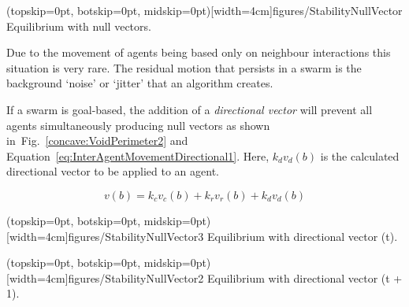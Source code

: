 \documentclass{ieeeaccess}
\begin{document}
\Figure[t!](topskip=0pt, botskip=0pt, midskip=0pt)[width=4cm]{figures/StabilityNullVector}
{Equilibrium with null vectors.\label{methods:StabilityNullVector}}


Due to the movement of agents being based only on neighbour interactions this situation is very rare. The residual motion that persists in a swarm is the background `noise' or `jitter' that an algorithm creates.

If a swarm is goal-based, the addition of a \textit{directional vector} will prevent all agents simultaneously producing null vectors as shown in~Fig.~\ref{concave:VoidPerimeter2} and Equation~\ref{eq:InterAgentMovementDirectional1}. Here, $k_dv_{d}(b)$ is the calculated directional vector to be applied to an agent.

\begin{equation}\label{eq:InterAgentMovementDirectional1}
v(b) = k_cv_{c}(b) + k_rv_{r}(b) + k_dv_{d}(b)
\end{equation}

\Figure[t!](topskip=0pt, botskip=0pt, midskip=0pt)[width=4cm]{figures/StabilityNullVector3}
{Equilibrium with directional vector (t).\label{concave:VoidPerimeter1}}


\Figure[t!](topskip=0pt, botskip=0pt, midskip=0pt)[width=4cm]{figures/StabilityNullVector2}
{Equilibrium with directional vector (t + 1).\label{concave:VoidPerimeter2}}

\end{document}
